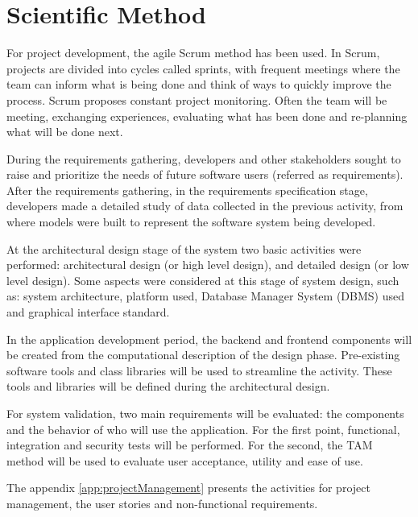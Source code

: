 \section{Scientific Method}\label{sec:method}

For project development, the agile Scrum method has been used. In Scrum, projects are divided into cycles called sprints, with frequent meetings where the team can inform what is being done and think of ways to quickly improve the process. Scrum proposes constant project monitoring. Often the team will be meeting, exchanging experiences, evaluating what has been done and re-planning what will be done next.

During the requirements gathering, developers and other stakeholders sought to raise and prioritize the needs of future software users (referred as requirements). After the requirements gathering, in the requirements specification stage, developers made a detailed study of data collected in the previous activity, from where models were built to represent the software system being developed.

At the architectural design stage of the system two basic activities were performed: architectural design (or high level design), and detailed design (or low level design). Some aspects were considered at this stage of system design, such as: system architecture, platform used, Database Manager System (DBMS) used and graphical interface standard.

In the application development period, the backend and frontend components will be created from the computational description of the design phase. Pre-existing software tools and class libraries will be used to streamline the activity. These tools and libraries will be defined during the architectural design.

For system validation, two main requirements will be evaluated: the components and the behavior of who will use the application. For the first point, functional, integration and security tests will be performed. For the second, the \acf{TAM} method will be used to evaluate user acceptance, utility and ease of use.

The appendix \ref{app:projectManagement} presents the activities for project management, the user stories and non-functional requirements.